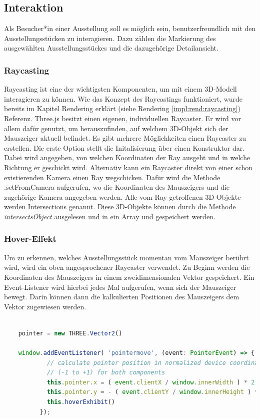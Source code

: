 \subsection{Interaktion}
Als Besucher*in einer Ausstellung soll es möglich sein, benutzerfreundlich mit den Ausstellungsstücken zu interagieren. Dazu zählen die Markierung des ausgewählten Ausstellungsstückes und die dazugehörige Detailansicht. 

\subsubsection{Raycasting}
\label{impl:int:raycasting}
Raycasting ist eine der wichtigsten Komponenten, um mit einem 3D-Modell interagieren zu können. Wie das Konzept des Raycastings funktioniert, wurde bereits im Kapitel Rendering erklärt (siehe Rendering \ref{impl:rend:raycasting}) Referenz. Three.js besitzt einen eigenen, individuellen Raycaster. Er wird vor allem dafür genutzt, um herauszufinden, auf welchem 3D-Objekt sich der Mauszeiger aktuell befindet. Es gibt mehrere Möglichkeiten einen Raycaster zu erstellen. Die erste Option stellt die Initalisierung über einen Konstruktor dar. Dabei wird angegeben, von welchen Koordinaten der Ray ausgeht und in welche Richtung er geschickt wird. Alternativ kann ein Raycaster direkt von einer schon existierenden Kamera einen Ray wegschicken. Dafür wird die Methode .setFromCamera aufgerufen, wo die Koordinaten des Mauszeigers und die zugehörige Kamera angegeben werden. Alle vom Ray getroffenen 3D-Objekte werden Intersections genannt. Diese 3D-Objekte können durch die Methode \emph{intersectsObject} ausgelesen und in ein Array und gespeichert werden.
\cite{ThreeJSRaycaster}

\subsubsection{Hover-Effekt}
Um zu erkennen, welches Ausstellungsstück momentan vom Mauszeiger berührt wird, wird ein oben angesprochener Raycaster verwendet. Zu Beginn werden die Koordinaten des Mauszeigers in einem zweidimensionalen Vektor gespeichert. Ein Event-Listener wird hierbei jedes Mal aufgerufen, wenn sich der Mauszeiger bewegt. Darin können dann die kalkulierten Positionen des Mauszeigers dem Vektor zugewiesen werden.

\begin{lstlisting}[caption={Aktuelle Koordinaten des Mauszeigers einem 2D-Vektor zuweisen},language=TypeScript]
    
    pointer = new THREE.Vector2()

    window.addEventListener( 'pointermove', (event: PointerEvent) => {
            // calculate pointer position in normalized device coordinates
            // (-1 to +1) for both components
            this.pointer.x = ( event.clientX / window.innerWidth ) * 2 - 1
            this.pointer.y = - ( event.clientY / window.innerHeight ) * 2 + 1
            this.hoverExhibit()
          });
    
    
        \end{lstlisting}


